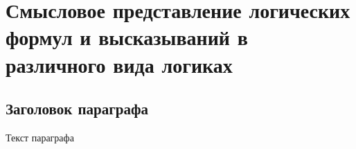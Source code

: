 
\chapter{Смысловое представление логических формул и высказываний в различного вида логиках}
\label{chapter_logic}


\section{Заголовок параграфа}
Текст параграфа

%